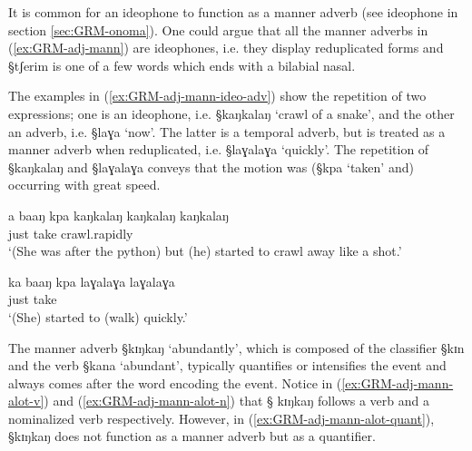 It is common for an ideophone to function as a manner adverb (see ideophone in
section \ref{sec:GRM-onoma}). One could argue that  all the manner adverbs in
(\ref{ex:GRM-adj-mann}) are ideophones, i.e. they display reduplicated forms
and {\S tʃerim} is one of a few words which ends with a bilabial nasal. 

The
examples in (\ref{ex:GRM-adj-mann-ideo-adv}) show the repetition of two
expressions; one is an ideophone, i.e. {\S kaŋkalaŋ} `crawl of a snake', and the
other an adverb, i.e.  {\S laɣa} `now'.  The latter is a temporal adverb, but is
treated as a manner adverb when reduplicated, i.e. {\S laɣalaɣa} `quickly'. The
repetition of {\S kaŋkalaŋ} and {\S  laɣalaɣa} conveys that the motion was
({\S kpa} `taken'  and) occurring with great speed.


\begin{exe}
\ex\label{ex:GRM-adj-mann-ideo-adv}
\begin{xlist}

\ex\label{ex:GRM-adj-mann-ideo}
\gll a baaŋ kpa {kaŋkalaŋ kaŋkalaŋ kaŋkalaŋ}\\
{\conn} just take crawl.rapidly\\
\glt `(She was after the python) but (he) started to crawl away like a shot.'

\ex\label{ex:GRM-adj-mann-adv}
\gll  ka baaŋ kpa laɣalaɣa laɣalaɣa\\
{\conn} just take {\advm} {\advm}\\
\glt `(She) started to (walk) quickly.'

\end{xlist}
\end{exe}


The manner adverb {\S kɪŋkaŋ} `abundantly',  which is composed of the classifier
{\S kɪn} and the verb {\S kana} `abundant',  typically quantifies or intensifies
the
event and always comes after the word encoding the event.  Notice in
(\ref{ex:GRM-adj-mann-alot-v})  and (\ref{ex:GRM-adj-mann-alot-n})   that {\S
kɪŋkaŋ} follows a verb and a nominalized verb respectively. However, in
(\ref{ex:GRM-adj-mann-alot-quant}), {\S kɪŋkaŋ} does not function as a
manner adverb but as a quantifier.



